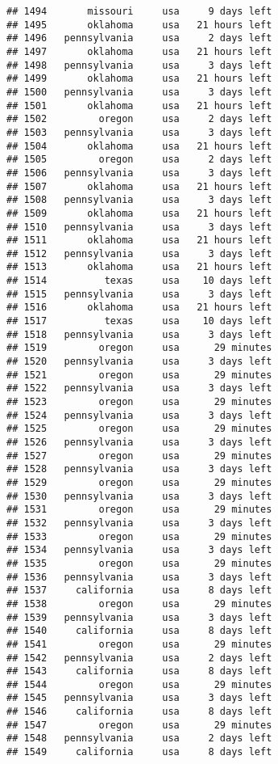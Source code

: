 \documentclass[
]{article}
\begin{document}
\begin{verbatim}
## 1494       missouri     usa     9 days left
## 1495       oklahoma     usa   21 hours left
## 1496   pennsylvania     usa     2 days left
## 1497       oklahoma     usa   21 hours left
## 1498   pennsylvania     usa     3 days left
## 1499       oklahoma     usa   21 hours left
## 1500   pennsylvania     usa     3 days left
## 1501       oklahoma     usa   21 hours left
## 1502         oregon     usa     2 days left
## 1503   pennsylvania     usa     3 days left
## 1504       oklahoma     usa   21 hours left
## 1505         oregon     usa     2 days left
## 1506   pennsylvania     usa     3 days left
## 1507       oklahoma     usa   21 hours left
## 1508   pennsylvania     usa     3 days left
## 1509       oklahoma     usa   21 hours left
## 1510   pennsylvania     usa     3 days left
## 1511       oklahoma     usa   21 hours left
## 1512   pennsylvania     usa     3 days left
## 1513       oklahoma     usa   21 hours left
## 1514          texas     usa    10 days left
## 1515   pennsylvania     usa     3 days left
## 1516       oklahoma     usa   21 hours left
## 1517          texas     usa    10 days left
## 1518   pennsylvania     usa     3 days left
## 1519         oregon     usa      29 minutes
## 1520   pennsylvania     usa     3 days left
## 1521         oregon     usa      29 minutes
## 1522   pennsylvania     usa     3 days left
## 1523         oregon     usa      29 minutes
## 1524   pennsylvania     usa     3 days left
## 1525         oregon     usa      29 minutes
## 1526   pennsylvania     usa     3 days left
## 1527         oregon     usa      29 minutes
## 1528   pennsylvania     usa     3 days left
## 1529         oregon     usa      29 minutes
## 1530   pennsylvania     usa     3 days left
## 1531         oregon     usa      29 minutes
## 1532   pennsylvania     usa     3 days left
## 1533         oregon     usa      29 minutes
## 1534   pennsylvania     usa     3 days left
## 1535         oregon     usa      29 minutes
## 1536   pennsylvania     usa     3 days left
## 1537     california     usa     8 days left
## 1538         oregon     usa      29 minutes
## 1539   pennsylvania     usa     3 days left
## 1540     california     usa     8 days left
## 1541         oregon     usa      29 minutes
## 1542   pennsylvania     usa     2 days left
## 1543     california     usa     8 days left
## 1544         oregon     usa      29 minutes
## 1545   pennsylvania     usa     3 days left
## 1546     california     usa     8 days left
## 1547         oregon     usa      29 minutes
## 1548   pennsylvania     usa     2 days left
## 1549     california     usa     8 days left

\end{verbatim}
\end{document}
